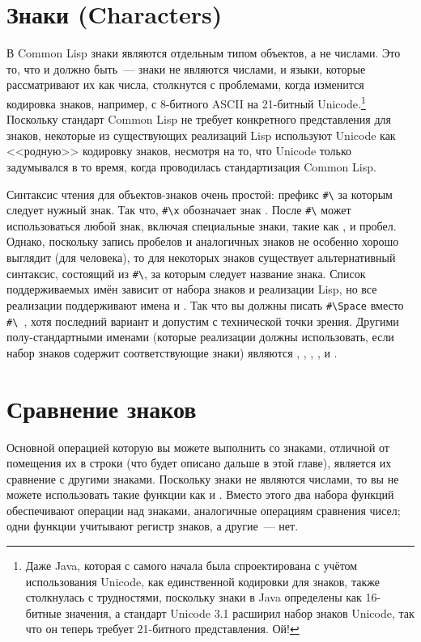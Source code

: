 \section{Знаки (Characters)}

В Common Lisp знаки являются отдельным типом объектов, а не числами.  Это то, что и должно
быть~--- знаки не являются числами, и языки, которые рассматривают их как числа, столкнутся
с проблемами, когда изменится кодировка знаков, например, с 8-битного ASCII на 21-битный
Unicode.\footnote{Даже Java, которая с самого начала была спроектирована с учётом
  использования Unicode, как единственной кодировки для знаков, также столкнулась с
  трудностями, поскольку знаки в Java определены как 16-битные значения, а стандарт
  Unicode 3.1 расширил набор знаков Unicode, так что он теперь требует 21-битного
  представления.  Ой!}  Поскольку стандарт Common Lisp не требует конкретного
представления для знаков, некоторые из существующих реализаций Lisp используют Unicode как
<<родную>> кодировку знаков, несмотря на то, что Unicode только задумывался в то время,
когда проводилась стандартизация Common Lisp.

Синтаксис чтения для объектов-знаков очень простой: префикс \lstinline!#\! за которым
следует нужный знак.  Так что, \lstinline!#\x! обозначает знак .  После
\lstinline!#\! может использоваться любой знак, включая специальные знаки, такие как
, \code{(} и пробел.  Однако, поскольку запись пробелов и аналогичных знаков не
особенно хорошо выглядит (для человека), то для некоторых знаков существует альтернативный
синтаксис, состоящий из \lstinline!#\!, за которым следует название знака.  Список
поддерживаемых имён зависит от набора знаков и реализации Lisp, но все реализации
поддерживают имена  и .  Так что вы должны писать
\lstinline!#\Space! вместо \lstinline!#\ !, хотя последний вариант и допустим с
технической точки зрения.  Другими полу-стандартными именами (которые реализации должны
использовать, если набор знаков содержит соответствующие знаки) являются ,
, , ,  и .

\section{Сравнение знаков}

Основной операцией которую вы можете выполнить со знаками, отличной от помещения их в
строки (что будет описано дальше в этой главе), является их сравнение с другими знаками.
Поскольку знаки не являются числами, то вы не можете использовать такие функции как
\code{<} и \code{>}.  Вместо этого два набора функций обеспечивают операции над знаками,
аналогичные операциям сравнения чисел; одни функции учитывают регистр знаков, а другие~---
нет.

